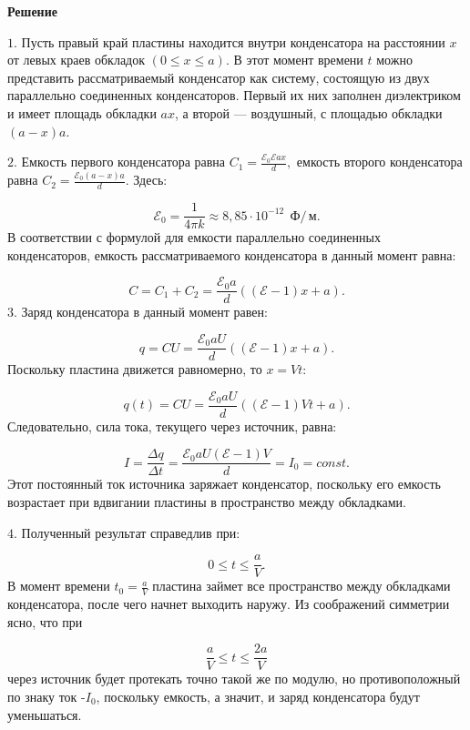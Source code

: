 \documentclass[12pt,a4paper]{article}
\begin{document}
{\begin{center}\end{center}
\par
}{
\smallskip\noindent\textbf{Решение}\par
$1$. Пусть правый край пластины находится внутри конденсатора на расстоянии $x$ от левых краев обкладок $( 0 \le x \le a ) .$ В этот момент времени $t$ можно представить рассматриваемый конденсатор как систему, состоящую из двух параллельно соединенных конденсаторов. Первый их них заполнен диэлектриком и имеет площадь обкладки $ax$, а второй — воздушный, с площадью обкладки $( a - x ) a.$\par
$2$. Емкость первого конденсатора равна $C_{1}= \frac{ \mathcal E_{0} \mathcal E ax}{ d } ,$ емкость второго конденсатора равна $C_{2}= \frac{ \mathcal E_{0} ( a - x ) a}{ d } .$ Здесь:\par
\[\mathcal E_{0}= \frac{ 1}{ 4 \pi k } \approx 8{,}85 \cdot 10 ^{ - 12 } \; \,\text{Ф}/\,\text{м}.\]
В соответствии с формулой для емкости параллельно соединенных конденсаторов, емкость рассматриваемого конденсатора в данный момент равна:\par
\[C=C_{1} + C_{2}= \frac{ \mathcal E_{0} a}{ d } ( ( \mathcal E - 1 ) x + a ) .\]
$3$. Заряд конденсатора в данный момент равен:\par
\[q=CU= \frac{ \mathcal E_{0} aU}{ d } ( ( \mathcal E - 1 ) x + a ) .\]
Поскольку пластина движется равномерно, то $x=Vt$:\par
\[q ( t ) =CU= \frac{ \mathcal E_{0} aU}{ d } ( ( \mathcal E - 1 ) Vt + a ) .\]
Следовательно, сила тока, текущего через источник, равна:\par
\[I= \frac{ \Delta q}{ \Delta t } = \frac{ \mathcal E_{0} aU ( \mathcal E - 1 ) V}{ d } =I_{0}=const.\]
Этот постоянный ток источника заряжает конденсатор, поскольку его емкость возрастает при вдвигании пластины в пространство между обкладками.\par
$4$. Полученный результат справедлив при:\par
\[0 \le t \le \frac{ a}{ V } .\]
В момент времени $t_{0}= \frac{ a}{ V }$ пластина займет все пространство между обкладками конденсатора, после чего начнет выходить наружу. Из соображений симметрии ясно, что при\par
\[\frac{ a}{ V } \le t \le \frac{ 2a}{ V }\]
через источник будет протекать точно такой же по модулю, но противоположный по знаку ток -$I_{0}$, поскольку емкость, а значит, и заряд конденсатора будут уменьшаться.\par

}
\end{document}
